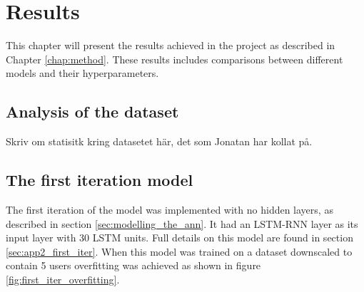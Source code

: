 \chapter{Results}\label{chap:results}
This chapter will present the results achieved in the project as described in Chapter \ref{chap:method}.  These results includes comparisons between different models and their hyperparameters.

\section{Analysis of the dataset}
Skriv om statisitk kring datasetet här, det som Jonatan har kollat på.

\section{The first iteration model}
The first iteration of the model was implemented with no hidden layers, as described in section \ref{sec:modelling_the_ann}. It had an LSTM-RNN layer as its input layer with 30 LSTM units. Full details on this model are found in section \ref{sec:app2_first_iter}. When this model was trained on a dataset downscaled to contain 5 users overfitting was achieved as shown in figure \ref{fig:first_iter_overfitting}.
